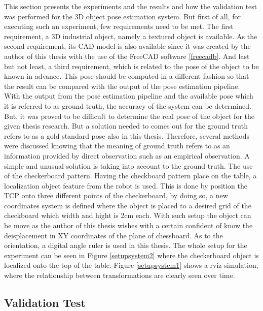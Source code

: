This section presents the experiments and the results and how the validation test was performed for the 3D object pose estimation system. But first of all, for executing such an experiment, few requirements need to be met. The first requirement, a 3D industrial object, namely a textured object is available. As the second requirement, its CAD model is also available since it was created by the author of this thesis with the use of the FreeCAD software \ref{freecadb}. And last but not least, a third requirement, which is related to the pose of the object to be known in advance. This pose should be computed in a different fashion so that the result can be compared with the output of the pose estimation pipeline.\\
With the output from the pose estimation pipeline and the available pose which it is referred to as ground truth, the accuracy of the system can be determined. But, it was proved to be difficult to determine the real pose of the object for the given thesis research. But a solution needed to comes out for the ground truth refers to as a gold standard pose also in this thesis. Therefore, several methods were discussed knowing that the meaning of ground truth refers to as an information provided by direct observation such as an empirical observation. A simple and unusual solution is taking into account to  the ground truth. The use of the checkerboard pattern. Having the checkboard pattern place on the table, a localization object feature from the robot is used. This is done by position the TCP onto three different points of the checkerboard, by doing so, a new coordinates system is defined where the object is placed to a desired grid of the checkboard which width and hight is 2cm each. With such setup the object can be move as the author of this thesis wishes with a certain confident of know the deisplacement in XY coordinates of the plane of chessboard. As to the orientation, a digital angle ruler is used in this thesis. The whole setup for the experiment can be seen in Figure \ref{setupsystem2} where the checkerboard object is localized onto the top of the table. Figure \ref{setupsystem1} shows a rviz simulation, where the relationship between transformations are clearly seen over time. 

\subsection{Validation Test}

